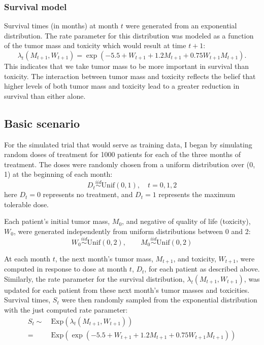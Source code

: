 \documentclass[12pt]{article}
\begin{document}

\subsubsection{Survival model} %
\label{ssub:survival_model}

Survival times (in months) at month $t$ were generated from an exponential distribution. The rate parameter for this distribution was modeled as a function of the tumor mass and toxicity which would result at time $t+1$:
\begin{equation}
  \lambda_{t}(M_{t+1}, W_{t+1}) = \exp(-5.5 + W_{t+1} + 1.2 M_{t+1} + 0.75 W_{t+1} M_{t+1}).
\end{equation}
This indicates that we take tumor mass to be more important in survival than toxicity. The interaction between tumor mass and toxicity reflects the belief that higher levels of both tumor mass and toxicity lead to a greater reduction in survival than either alone.



\subsection{Basic scenario} %
\label{sub:basic_setup}

For the simulated trial that would serve as training data, I began by simulating random doses of treatment for 1000 patients for each of the three months of treatment. The doses were randomly chosen from a uniform distribution over (0, 1) at the beginning of each month:
%
\begin{equation}
  D_{t} \overset{iid}{\sim} \text{Unif}(0, 1), \quad t = 0, 1, 2
\end{equation}
%
here $D_{t} = 0$ represents no treatment, and $D_{t} = 1$ represents the maximum tolerable dose.

Each patient's initial tumor mass, $M_{0}$, and negative of quality of life (toxicity), $W_{0}$, were generated independently from uniform distributions between 0 and 2:
%
\begin{equation}
  W_{0} \overset{iid}{\sim} \text{Unif}(0, 2), \qquad
  M_{0} \overset{iid}{\sim} \text{Unif}(0, 2)
\end{equation}

At each month $t$, the next month's tumor mass, $M_{t + 1}$, and toxicity, $W_{t + 1}$, were computed in response to dose at month $t$, $D_{t}$, for each patient as described above. Similarly, the rate parameter for the survival distribution, $\lambda_{t}(M_{t + 1}, W_{t + 1})$, was updated for each patient from these next month's tumor masses and toxicities. Survival times, $S_{t}$ were then randomly sampled from the exponential distribution with the just computed rate parameter:
\begin{align}
  S_{t} \sim ~ &\text{Exp}(\lambda_{t}(M_{t + 1}, W_{t + 1})) \\
  = ~ &\text{Exp}(\exp(-5.5 + W_{t+1} + 1.2 M_{t+1} + 0.75 W_{t+1} M_{t+1}))
\end{align}
\end{document}
